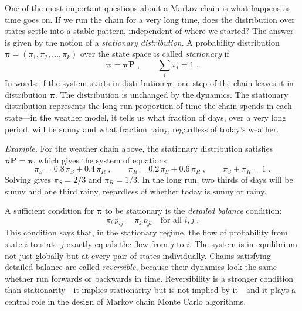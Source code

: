 One of the most important questions about a Markov chain is what happens as time goes on. If we run the chain for a very long time, does the distribution over states settle into a stable pattern, independent of where we started? The answer is given by the notion of a \textit{stationary distribution}. A probability distribution $\boldsymbol{\pi} = (\pi_1, \pi_2, \dots, \pi_k)$ over the state space is called \textit{stationary} if
\begin{equation}
    \boldsymbol{\pi} = \boldsymbol{\pi} \mathbf{P} \; , \qquad \sum_i \pi_i = 1 \; .
\end{equation}
In words: if the system starts in distribution $\boldsymbol{\pi}$, one step of the chain leaves it in distribution $\boldsymbol{\pi}$. The distribution is unchanged by the dynamics. The stationary distribution represents the long-run proportion of time the chain spends in each state---in the weather model, it tells us what fraction of days, over a very long period, will be sunny and what fraction rainy, regardless of today's weather.

\medskip

\textit{Example.} For the weather chain above, the stationary distribution satisfies $\boldsymbol{\pi}\mathbf{P} = \boldsymbol{\pi}$, which gives the system of equations
\[
    \pi_S = 0.8\,\pi_S + 0.4\,\pi_R \; , \qquad \pi_R = 0.2\,\pi_S + 0.6\,\pi_R \; , \qquad \pi_S + \pi_R = 1 \; .
\]
Solving gives $\pi_S = 2/3$ and $\pi_R = 1/3$. In the long run, two thirds of days will be sunny and one third rainy, regardless of whether today is sunny or rainy.

\medskip

A sufficient condition for $\boldsymbol{\pi}$ to be stationary is the \textit{detailed balance} condition:
\begin{equation}
    \pi_i \, p_{ij} = \pi_j \, p_{ji} \quad \text{for all } i, j \; .
\end{equation}
This condition says that, in the stationary regime, the flow of probability from state $i$ to state $j$ exactly equals the flow from $j$ to $i$. The system is in equilibrium not just globally but at every pair of states individually. Chains satisfying detailed balance are called \textit{reversible}, because their dynamics look the same whether run forwards or backwards in time. Reversibility is a stronger condition than stationarity---it implies stationarity but is not implied by it---and it plays a central role in the design of Markov chain Monte Carlo algorithms.

